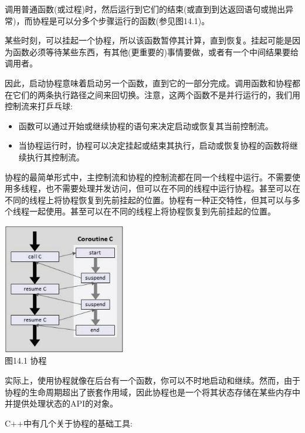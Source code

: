 调用普通函数(或过程)时，然后运行到它们的结束(或直到到达返回语句或抛出异常)，而协程是可以分多个步骤运行的函数(参见图14.1)。

某些时刻，可以挂起一个协程，所以该函数暂停其计算，直到恢复。挂起可能是因为函数必须等待某些东西，有其他(更重要的)事情要做，或者有一个中间结果要给调用者。

因此，启动协程意味着启动另一个函数，直到它的一部分完成。调用函数和协程都在它们的两条执行路径之间来回切换。注意，这两个函数不是并行运行的，我们用控制流来打乒乓球:

\begin{itemize}
\item 
函数可以通过开始或继续协程的语句来决定启动或恢复其当前控制流。

\item 
当协程运行时，协程可以决定挂起或结束其执行，启动或恢复协程的函数将继续执行其控制流。
\end{itemize}

协程的最简单形式中，主控制流和协程的控制流都在同一个线程中运行。不需要使用多线程，也不需要处理并发访问，但可以在不同的线程中运行协程。甚至可以在不同的线程上将协程恢复到先前挂起的位置。协程有一种正交特性，但其可以与多个线程一起使用。甚至可以在不同的线程上将协程恢复到先前挂起的位置。

\begin{center}
\includegraphics[width=0.4\textwidth]{content/chapter14/images/1.png}\\
图14.1 协程
\end{center}

实际上，使用协程就像在后台有一个函数，你可以不时地启动和继续。然而，由于协程的生命周期超出了嵌套作用域，因此协程也是一个将其状态存储在某些内存中并提供处理状态的API的对象。

C++中有几个关于协程的基础工具:

